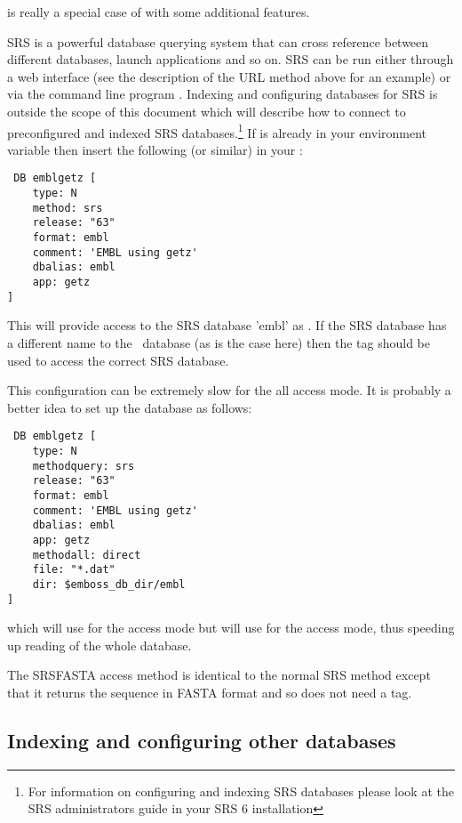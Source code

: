 \documentclass{report}
\begin{document}
 is really a special case of  with some additional features.

SRS is a powerful database querying system that can cross reference between different databases, launch applications and so on. SRS can be run either through a web interface (see the description of the URL method above for an example) or via the command line program .
Indexing and configuring databases for SRS is outside the scope of this document which will describe how to connect to preconfigured and indexed SRS databases.\footnote{For information on configuring and indexing SRS databases please look at the SRS administrators guide  in your SRS 6 installation}
If  is already in your  environment variable then insert the following (or similar) in your :
\begin{verbatim}
 DB emblgetz [ 
    type: N 
    method: srs 
    release: "63" 
    format: embl
    comment: 'EMBL using getz' 
    dbalias: embl 
    app: getz 
]
\end{verbatim}

This will provide access to the SRS database 'embl' as . If the SRS database has a different name to the \EMBOSS\ database (as is the case here) then the  tag should be used to access the correct SRS database.

This configuration can be extremely slow for the all access mode. It is probably a better idea to set up the database as follows:
\begin{verbatim}
 DB emblgetz [ 
    type: N 
    methodquery: srs 
    release: "63" 
    format: embl
    comment: 'EMBL using getz' 
    dbalias: embl 
    app: getz 
    methodall: direct
    file: "*.dat"
    dir: $emboss_db_dir/embl
]
\end{verbatim}
which will use  for the  access mode but will use  for the  access mode, thus speeding up reading of the whole database.

The SRSFASTA access method is identical to the normal SRS method except that it returns the sequence in FASTA format and so does not need a  tag.


\subsection{Indexing and configuring other databases}
\end{document}
